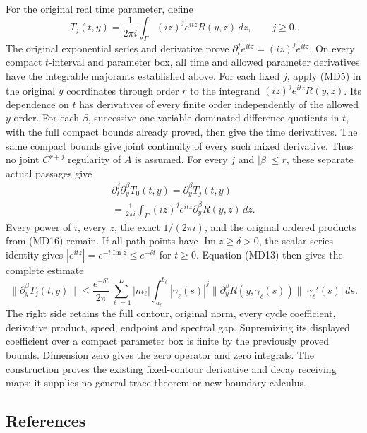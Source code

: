 \documentclass[
  11pt,
]{article}
\begin{document}
For the original real time parameter, define \[
 T_j(t,y)=\frac{1}{2\pi i}\int_\Gamma
                     (iz)^j e^{itz}R(y,z)\,dz,\qquad j\geq0 .
\tag{MD17}
\] The original exponential series and derivative prove
\(\partial_t^j e^{itz}=(iz)^j e^{itz}\). On every compact \(t\)-interval
and parameter box, all time and allowed parameter derivatives have the
integrable majorants established above. For each fixed \(j\), apply
(MD5) in the original \(y\) coordinates through order \(r\) to the
integrand \((iz)^j e^{itz}R(y,z)\). Its dependence on \(t\) has
derivatives of every finite order independently of the allowed \(y\)
order. For each \(\beta\), successive one-variable dominated difference
quotients in \(t\), with the full compact bounds already proved, then
give the time derivatives. The same compact bounds give joint continuity
of every such mixed derivative. Thus no joint \(C^{r+j}\) regularity of
\(A\) is assumed. For every \(j\) and \(|\beta|\leq r\), these separate
actual passages give \[
\begin{gathered}
\partial_t^j\partial_y^\beta T_0(t,y)=\partial_y^\beta T_j(t,y)\\
=\frac{1}{2\pi i}\int_\Gamma (iz)^j e^{itz}
\partial_y^\beta R(y,z)\,dz .
\end{gathered}
\tag{MD18}
\] Every power of \(i\), every \(z\), the exact \(1/(2\pi i)\), and the
original ordered products from (MD16) remain. If all path points have
\(\operatorname{Im}z\geq\delta>0\), the scalar series identity gives
\(|e^{itz}|=e^{-t\operatorname{Im}z}\leq e^{-\delta t}\) for \(t\geq0\).
Equation (MD13) then gives the complete estimate \[
 \|\partial_y^\beta T_j(t,y)\|
   \leq\frac{e^{-\delta t}}{2\pi}
       \sum_{\ell=1}^L |m_\ell|
          \int_{a_\ell}^{b_\ell}
              |\gamma_\ell(s)|^j
              \|\partial_y^\beta R(y,\gamma_\ell(s))\|
              |\gamma_\ell'(s)|\,ds .
\tag{MD19}
\] The right side retains the full contour, original norm, every cycle
coefficient, derivative product, speed, endpoint and spectral gap.
Supremizing its displayed coefficient over a compact parameter box is
finite by the previously proved bounds. Dimension zero gives the zero
operator and zero integrals. The construction proves the existing
fixed-contour derivative and decay receiving maps; it supplies no
general trace theorem or new boundary calculus.

\subsection{References}\label{references}
\end{document}
